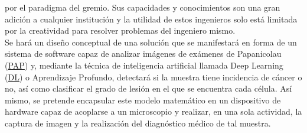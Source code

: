     por el paradigma del gremio. Sus capacidades y conocimientos son una gran
    adición a cualquier institución y la utilidad de estos ingenieros solo está
    limitada por la creatividad para resolver problemas del ingeniero
    mismo.~\cite{Kelleher2015} \\ 
    Se hará un diseño conceptual de una solución que se manifestará en forma de
    un sistema de software capaz de analizar imágenes de exámenes de Papanicolau
    (\hyperlink{abbr}{PAP}) y, mediante la
    técnica de inteligencia artificial llamada Deep Learning
    (\hyperlink{abbr}{DL}) o Aprendizaje
    Profundo, detectará si la muestra tiene incidencia de cáncer o no, así como
    clasificar el grado de lesión en el que se encuentra cada célula. Así mismo,
    se pretende encapsular este modelo matemático en un dispositivo de hardware
    capaz de acoplarse a un microscopio y realizar, en una sola actividad, la
    captura de imagen y la realización del diagnóstico médico de tal
    muestra.~\cite{Engelbrecht2005} \\

